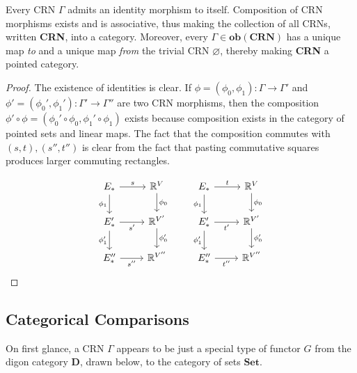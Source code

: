 \documentclass[11pt, one side, article]{memoir}
\begin{document}
\begin{proposition}\label{prop:CRN-pointed-category}
    Every CRN $\Gamma$ admits an identity morphism to itself.
    Composition of CRN morphisms exists and is associative, thus making the collection of all CRNs, written \textbf{CRN}, into a category.
    Moreover, every $\Gamma\in \mathbf{ob}(\textbf{CRN})$ has a unique map \emph{to} and a unique map \emph{from} the trivial CRN $\varnothing$, thereby making \textbf{CRN} a pointed category. 
\end{proposition}
\begin{proof}
    The existence of identities is clear.
    If $\phi=(\phi_0,\phi_1):\Gamma \to \Gamma'$ and $\phi'=(\phi_0',\phi_1'):\Gamma' \to \Gamma''$ are two CRN morphisms, then the composition $\phi' \circ \phi=(\phi_0'\circ \phi_0,\phi_1'\circ\phi_1)$ exists because composition exists in the category of pointed sets and linear maps. The fact that the composition commutes with $(s,t),(s'',t'')$ is clear from the fact that pasting commutative squares produces larger commuting rectangles.

    \[\begin{tikzcd}
	E_* & {\mathbb{R}^V} & E_* & {\mathbb{R}^V} \\
	{E_*'} & {\mathbb{R}^{V'}} & {E_*'} & {\mathbb{R}^{V'}} \\
	{E_*''} & {\mathbb{R}^{V''}} & {E_*''} & {\mathbb{R}^{V''}}
	\arrow["s", from=1-1, to=1-2]
	\arrow["{\phi_1}"', from=1-1, to=2-1]
	\arrow["{\phi_0}", from=1-2, to=2-2]
	\arrow["t", from=1-3, to=1-4]
	\arrow["{\phi_1}"', from=1-3, to=2-3]
	\arrow["{\phi_0}", from=1-4, to=2-4]
	\arrow["{s'}"', from=2-1, to=2-2]
	\arrow["{\phi'_1}"', from=2-1, to=3-1]
	\arrow["{\phi'_0}", from=2-2, to=3-2]
	\arrow["{t'}"', from=2-3, to=2-4]
	\arrow["{\phi'_1}"', from=2-3, to=3-3]
	\arrow["{\phi'_0}", from=2-4, to=3-4]
	\arrow["{s''}"', from=3-1, to=3-2]
	\arrow["{t''}"', from=3-3, to=3-4]
\end{tikzcd}\]
\end{proof}

\subsection{Categorical Comparisons}


On first glance, a CRN $\Gamma$ appears to be just a special type of functor $G$ from the digon category $\mathbf{D}$, drawn below, to the category of sets $\mathbf{Set}$.
\end{document}
